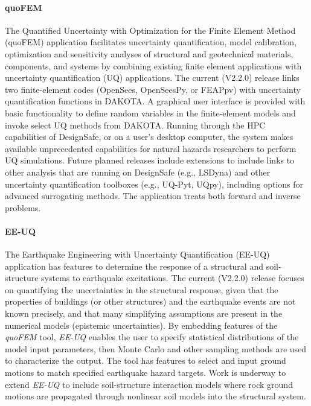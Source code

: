 \paragraph{quoFEM}  The Quantified Uncertainty with Optimization for the Finite Element Method (quoFEM) application facilitates uncertainty quantification, model calibration, optimization and sensitivity analyses of structural and geotechnical materials, components, and systems by combining existing finite element applications with uncertainty quantification (UQ) applications. The current (V2.2.0) release links two finite-element codes (OpenSees, OpenSeesPy, or FEAPpv) with uncertainty quantification functions in DAKOTA. A graphical user interface is provided with basic functionality to define random variables in the finite-element models and invoke select UQ methods from DAKOTA. Running through the HPC capabilities of DesignSafe, or on a user’s desktop computer, the system makes available unprecedented capabilities for natural hazards researchers to perform UQ simulations. Future planned releases include extensions to include links to other analysis that are running on DesignSafe (e.g., LSDyna) and other uncertainty quantification toolboxes (e.g., UQ-Pyt, UQpy), including options for advanced surrogating methods. The application treats both forward and inverse problems.

\paragraph{EE-UQ} The Earthquake Engineering with Uncertainty Quantification (EE-UQ) application has features to determine the response of a structural and soil-structure systems to earthquake excitations. The current (V2.2.0) release focuses on quantifying the uncertainties in the structural response, given that the properties of buildings (or other structures) and the earthquake events are not known precisely, and that many simplifying assumptions are present in the numerical models (epistemic uncertainties).  By embedding features of the \emph{quoFEM} tool, \emph{EE-UQ} enables the user to specify statistical distributions of the model input parameters, then Monte Carlo and other sampling methods are used to characterize the output. The tool has features to select and input ground motions to match specified earthquake hazard targets. Work is underway to extend \emph{EE-UQ} to include soil-structure interaction models where rock ground motions are propagated through nonlinear soil models into the structural system.

